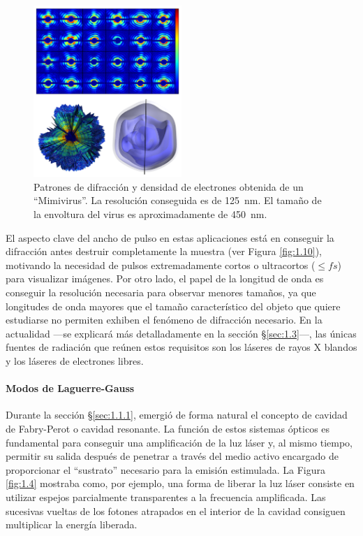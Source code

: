 \begin{figure}[htpb]
  \centering
  \includegraphics[width=0.5\textwidth]{Figuras/ch1_pulso.png}
  \caption{Patrones de difracción y densidad de electrones obtenida de un \enquote{Mimivirus}\autocite{Ekeberg2015}. La resolución conseguida es de \qty{125}{nm}. El tamaño de la envoltura del virus es aproximadamente de \qty{450}{nm}.}
  \label{fig:1.9}
\end{figure}

El aspecto clave del ancho de pulso en estas aplicaciones está en conseguir la difracción antes destruir completamente la muestra\autocite{Neutze2000} (ver Figura \ref{fig:1.10}), motivando la necesidad de pulsos extremadamente cortos o ultracortos ($\le\unit{fs}$) para visualizar imágenes. Por otro lado, el papel de la longitud de onda es conseguir la resolución necesaria para observar menores tamaños, ya que longitudes de onda mayores que el tamaño característico del objeto que quiere estudiarse no permiten exhiben el fenómeno de difracción necesario. En la actualidad ---se explicará más detalladamente en la sección \S\ref{sec:1.3}---, las únicas fuentes de radiación que reúnen estos requisitos son los láseres de rayos X blandos y los láseres de electrones libres.

\paragraph{Modos de Laguerre-Gauss}
Durante la sección \S\ref{sec:1.1.1}, emergió de forma natural el concepto de cavidad de Fabry-Perot o cavidad resonante. La función de estos sistemas ópticos es fundamental para conseguir una amplificación de la luz láser y, al mismo tiempo, permitir su salida después de penetrar a través del medio activo encargado de proporcionar el \enquote{sustrato} necesario para la emisión estimulada. La Figura \ref{fig:1.4} mostraba como, por ejemplo, una forma de liberar la luz láser consiste en utilizar espejos parcialmente transparentes a la frecuencia amplificada. Las sucesivas vueltas de los fotones atrapados en el interior de la cavidad consiguen multiplicar la energía liberada. 

